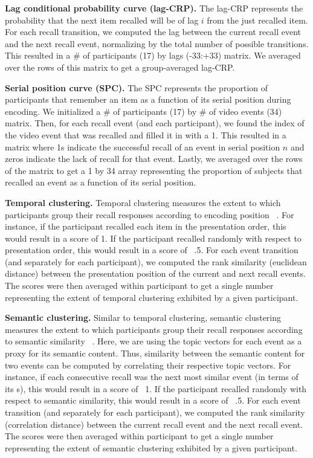 \documentclass{article}
\begin{document}
{\textbf{Lag conditional probability curve (lag-CRP).} The lag-CRP represents the probability that the next item recalled will be of lag $i$ from the just recalled item. For each recall transition, we computed the lag between the current recall event and the next recall event, normalizing by the total number of possible transitions.  This resulted in a \# of participants (17) by lags (-33:+33) matrix. We averaged over the rows of this matrix to get a group-averaged lag-CRP.

\textbf{Serial position curve (SPC).} The SPC represents the proportion of participants that remember an item as a function of its serial position during encoding. We initialized a \# of participants (17) by \# of video events (34) matrix. Then, for each recall event (and each participant), we found the index of the video event that was recalled and filled it in with a 1. This resulted in a matrix where 1s indicate the successful recall of an event in serial position $n$ and zeros indicate the lack of recall for that event.  Lastly, we averaged over the rows of the matrix to get a 1 by 34 array representing the proportion of subjects that recalled an event as a function of its serial position.

\textbf{Temporal clustering.} Temporal clustering measures the extent to which participants group their recall responses according to encoding position ~\citep{PolyEtal09}. For instance, if the participant recalled each item in the presentation order, this would result in a score of 1. If the participant recalled randomly with respect to presentation order, this would result in a score of ~.5.  For each event transition (and separately for each participant), we computed the rank similarity (euclidean distance) between the presentation position  of the current and next recall events. The scores were then averaged within participant to get a single number representing the extent of temporal clustering exhibited by a given participant.

\textbf{Semantic clustering.} Similar to temporal clustering, semantic clustering measures the extent to which participants group their recall responses according to semantic similarity ~\citep{PolyEtal09}. Here, we are using the topic vectors for each event as a proxy for its semantic content. Thus, similarity between the semantic content for two events can be computed by correlating their respective topic vectors.  For instance, if each consecutive recall was the next most similar event (in terms of its s), this would result in a score of ~1. If the participant recalled randomly with respect to semantic similarity, this would result in a score of ~.5.  For each event transition (and separately for each participant), we computed the rank similarity (correlation distance) between the current recall event and the next recall event. The scores were then averaged within participant to get a single number representing the extent of semantic clustering exhibited by a given participant.

}
\end{document}
